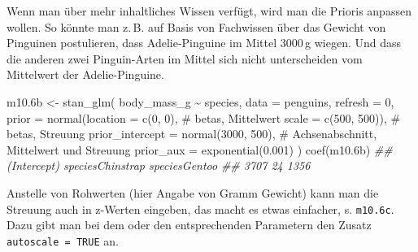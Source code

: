 \documentclass[
  ngerman,
  letterpaper,
  twoside,
  open=any]{scrbook}
\newenvironment{Shaded}{\begin{snugshade}}{\end{snugshade}}
\newcommand{\AttributeTok}[1]{\textcolor[rgb]{0.40,0.45,0.13}{#1}}
\newcommand{\CommentTok}[1]{\textcolor[rgb]{0.37,0.37,0.37}{#1}}
\newcommand{\DecValTok}[1]{\textcolor[rgb]{0.68,0.00,0.00}{#1}}
\newcommand{\DocumentationTok}[1]{\textcolor[rgb]{0.37,0.37,0.37}{\textit{#1}}}
\newcommand{\FloatTok}[1]{\textcolor[rgb]{0.68,0.00,0.00}{#1}}
\newcommand{\FunctionTok}[1]{\textcolor[rgb]{0.28,0.35,0.67}{#1}}
\newcommand{\NormalTok}[1]{\textcolor[rgb]{0.00,0.23,0.31}{#1}}
\newcommand{\OtherTok}[1]{\textcolor[rgb]{0.00,0.23,0.31}{#1}}
\newcommand{\SpecialCharTok}[1]{\textcolor[rgb]{0.37,0.37,0.37}{#1}}
\theoremstyle{definition}
\theoremstyle{plain}
\theoremstyle{definition}
\theoremstyle{definition}
\theoremstyle{definition}
\theoremstyle{definition}
\theoremstyle{remark}
\begin{document}
Wenn man über mehr inhaltliches Wissen verfügt, wird man die Prioris
anpassen wollen. So könnte man z.\,B. auf Basis von Fachwissen über das
Gewicht von Pinguinen postulieren, dass Adelie-Pinguine im Mittel
3000\,g wiegen. Und dass die anderen zwei Pinguin-Arten im Mittel sich
nicht unterscheiden vom Mittelwert der Adelie-Pinguine.

\begin{Shaded}
\begin{Highlighting}[]
\NormalTok{m10}\FloatTok{.6}\NormalTok{b }\OtherTok{\textless{}{-}} \FunctionTok{stan\_glm}\NormalTok{(}
\NormalTok{  body\_mass\_g }\SpecialCharTok{\textasciitilde{}}\NormalTok{ species, }
  \AttributeTok{data =}\NormalTok{ penguins, }
  \AttributeTok{refresh =} \DecValTok{0}\NormalTok{,}
  \AttributeTok{prior =} \FunctionTok{normal}\NormalTok{(}\AttributeTok{location =} \FunctionTok{c}\NormalTok{(}\DecValTok{0}\NormalTok{, }\DecValTok{0}\NormalTok{),  }\CommentTok{\# betas, Mittelwert}
                 \AttributeTok{scale =} \FunctionTok{c}\NormalTok{(}\DecValTok{500}\NormalTok{, }\DecValTok{500}\NormalTok{)),  }\CommentTok{\# betas, Streuung}
  \AttributeTok{prior\_intercept =} \FunctionTok{normal}\NormalTok{(}\DecValTok{3000}\NormalTok{, }\DecValTok{500}\NormalTok{),  }\CommentTok{\# Achsenabschnitt, Mittelwert und Streuung}
  \AttributeTok{prior\_aux =} \FunctionTok{exponential}\NormalTok{(}\FloatTok{0.001}\NormalTok{)}
\NormalTok{)}
\FunctionTok{coef}\NormalTok{(m10}\FloatTok{.6}\NormalTok{b)}
\DocumentationTok{\#\#      (Intercept) speciesChinstrap    speciesGentoo }
\DocumentationTok{\#\#             3707               24             1356}
\end{Highlighting}
\end{Shaded}

Anstelle von Rohwerten (hier Angabe von Gramm Gewicht) kann man die
Streuung auch in z-Werten eingeben, das macht es etwas einfacher, s.
\texttt{m10.6c}. Dazu gibt man bei dem oder den entsprechenden
Parametern den Zusatz \texttt{autoscale\ =\ TRUE} an.
\end{document}
